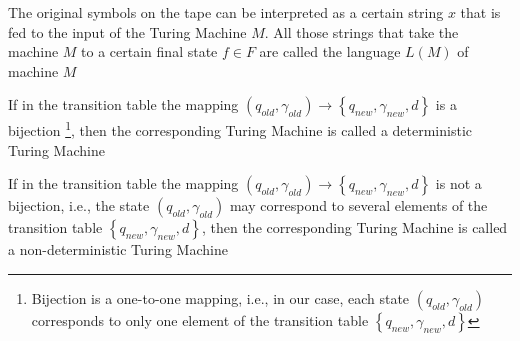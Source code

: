 \begin{definition}
The original symbols on the tape can be interpreted as a certain string $x$
that is fed to the input of the Turing Machine $M$. All those strings that
take the machine $M$ to a certain final state $f \in F$
are called the language $L\left(M\right)$ of machine $M$
\end{definition}

\begin{definition}
If in the transition table the mapping
\(
\left(q_{old}, \gamma_{old}\right) \rightarrow 
\left\{q_{new}, \gamma_{new}, d\right\}
\)
is a bijection 
\footnote{Bijection is a one-to-one mapping, i.e., in our
  case, each state $\left(q_{old}, \gamma_{old}\right)$
  corresponds to only one element of the transition table 
  $\left\{q_{new}, \gamma_{new}, d\right\}$
},
then the corresponding Turing Machine
is called a deterministic Turing Machine
\label{defAlgoDMT}
\end{definition}

\begin{definition}
If in the transition table the mapping
\(
\left(q_{old}, \gamma_{old}\right) \rightarrow 
\left\{q_{new}, \gamma_{new}, d\right\}
\)
is not a bijection, i.e., the state $\left(q_{old}, \gamma_{old}\right)$
may correspond to several elements of the transition table 
$\left\{q_{new}, \gamma_{new}, d\right\}$,
then the corresponding Turing Machine
is called a non-deterministic Turing Machine
\label{defAlgoNDMT}
\end{definition}